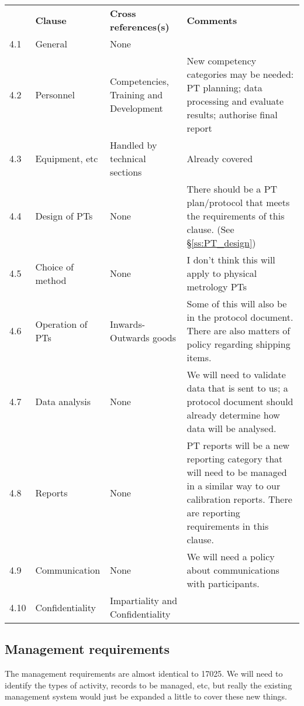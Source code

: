 \begin{center}
{\renewcommand*{\arraystretch}{1.4}
\begin{tabular}{p{1em}p{10em}p{12em}p{16em}}
	\rowcolor[rgb]{ 0,  0,  0} 
	\textcolor[rgb]{ 1,  1,  1}{} & 
	\textcolor[rgb]{ 1,  1,  1}{\textbf{Clause}} & 
	\textcolor[rgb]{ 1,  1,  1}{\textbf{Cross references(s)}} &
	\textcolor[rgb]{ 1,  1,  1}{\textbf{Comments}} \\
4.1 & General & None &   \\
4.2	& Personnel &
Competencies, Training and Development \cite[\S\ref*{QM-s:competencies_professional_development}]{MSL_Quality_Manual} & 
New competency categories may be needed: PT planning; data processing and evaluate results; authorise final report \\
4.3	& Equipment, etc & Handled by technical sections	& Already covered \\
4.4	& Design of PTs	& None	& There should be a PT plan/protocol that meets the requirements of this clause. (See \S\ref{ss:PT_design}) \\
4.5	& Choice of method	& None	& I don't think this will apply to physical metrology PTs \\
4.6	& Operation of PTs	& Inwards-Outwards goods \cite[\S\ref*{QM-s:inwards_outwards_goods}]{MSL_Quality_Manual} & 
Some of this will also be in the protocol document. There are also matters of policy regarding shipping items. \\
4.7	& Data analysis	& None	& We will need to validate data that is sent to us; a protocol document should already determine how data will be analysed.\\
4.8	& Reports	& None	& PT reports will be a new reporting category that will need to be managed in a similar way to our calibration reports. There are reporting requirements in this clause.\\
4.9	& Communication	& None	& We will need a policy about communications with participants.\\
4.10	& Confidentiality	& Impartiality \cite[\S\ref*{QM-sssp:impartiality}]{MSL_Quality_Manual} and Confidentiality \cite[\S\ref*{QM-sss:confidentiality}]{MSL_Quality_Manual} 

\end{tabular} } 
\end{center}

\newpage
\subsection{Management requirements}
The management requirements are almost identical to 17025. We will need to identify the types of activity, records to be managed, etc, but really the existing management system would just be expanded a little to cover these new things.


